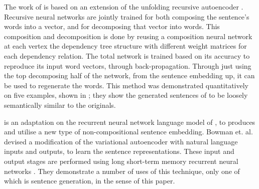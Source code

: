 \documentclass[11pt]{article}
\theoremstyle{plain}
\theoremstyle{definition}
\begin{document}
The work of \textcite{iyyer2014generating} is based on an extension of the unfolding recursive autoencoder \textcite{SocherEtAl2011:PoolRAE}. Recursive neural networks are jointly trained for both composing the sentence's words into a vector, and for decomposing that vector into words. This composition and decomposition is done by reusing a composition neural network at each vertex the  dependency tree structure with different weight matrices for each dependency relation. The total network is trained based on its accuracy to reproduce its input word vectors, through back-propagation. Through just using the top decomposing half of the network, from the sentence embedding up, it can be used to regenerate the words. This method was demonstrated quantitatively on five examples, shown in ; they show the generated sentences of \textcite{iyyer2014generating} to be loosely semantically similar to the originals.





\textcite{Bowman2015SmoothGeneration} is an adaptation on the recurrent neural network language model of \textcite{mikolov2011RnnLM}, to produces and utilise a new type of non-compositional sentence embedding. Bowman et. al. devised a modification of the variational autoencoder  \parencite{kingma2013auto} with natural language inputs and outputs, to learn the sentence representations. These input and output stages are performed using long short-term memory recurrent neural networks \parencite{hochreiter1997long}. They demonstrate a number of uses of this technique, only one of which is sentence generation, in the sense of this paper.
\end{document}
